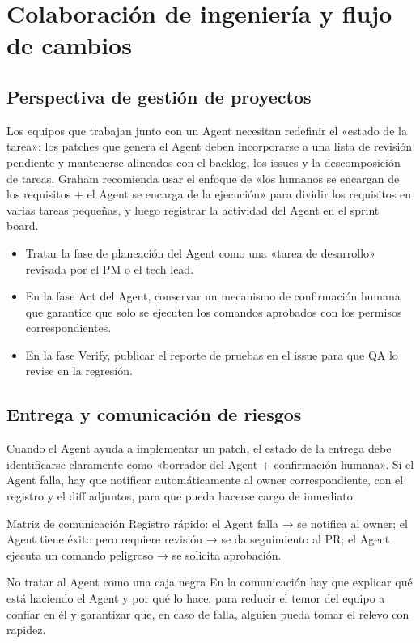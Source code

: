 \section{Colaboración de ingeniería y flujo de cambios}
\subsection{Perspectiva de gestión de proyectos}
Los equipos que trabajan junto con un Agent necesitan redefinir el «estado de la tarea»: los patches que genera el Agent deben incorporarse a una lista de revisión pendiente y mantenerse alineados con el backlog, los issues y la descomposición de tareas. Graham recomienda usar el enfoque de «los humanos se encargan de los requisitos + el Agent se encarga de la ejecución» para dividir los requisitos en varias tareas pequeñas, y luego registrar la actividad del Agent en el sprint board.

\begin{itemize}
    \item Tratar la fase de planeación del Agent como una «tarea de desarrollo» revisada por el PM o el tech lead.
    \item En la fase Act del Agent, conservar un mecanismo de confirmación humana que garantice que solo se ejecuten los comandos aprobados con los permisos correspondientes.
    \item En la fase Verify, publicar el reporte de pruebas en el issue para que QA lo revise en la regresión.
\end{itemize}

\subsection{Entrega y comunicación de riesgos}
Cuando el Agent ayuda a implementar un patch, el estado de la entrega debe identificarse claramente como «borrador del Agent + confirmación humana». Si el Agent falla, hay que notificar automáticamente al owner correspondiente, con el registro y el diff adjuntos, para que pueda hacerse cargo de inmediato.

 \begin{knowledgebox}{Matriz de comunicación}
Registro rápido: el Agent falla → se notifica al owner; el Agent tiene éxito pero requiere revisión → se da seguimiento al PR; el Agent ejecuta un comando peligroso → se solicita aprobación.
\end{knowledgebox}

\begin{warningbox}{No tratar al Agent como una caja negra}
En la comunicación hay que explicar qué está haciendo el Agent y por qué lo hace, para reducir el temor del equipo a confiar en él y garantizar que, en caso de falla, alguien pueda tomar el relevo con rapidez.
\end{warningbox}


